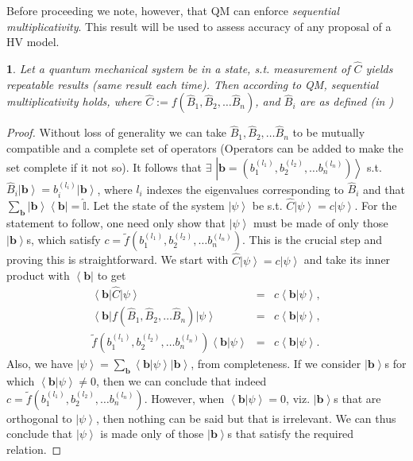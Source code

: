 \documentclass[british,aps,prl,superscriptaddress,nofootinbib,times,reprint]{revtex4-1}
\theoremstyle{plain}
\theoremstyle{definition}
\theoremstyle{remark}
\theoremstyle{remark}
\theoremstyle{remark}
\theoremstyle{plain}
\newtheorem*{prop*}{\protect\propositionname}
\theoremstyle{plain}
\theoremstyle{plain}
\theoremstyle{definition}
\theoremstyle{definition}
\providecommand{\propositionname}{Proposition}
\begin{document}
Before proceeding we note, however, that QM can
enforce \emph{sequential multiplicativity}. This
result will be used to assess accuracy of any
proposal of a HV
model.
\begin{prop*} 
Let a quantum mechanical 
system be in a state, s.t. measurement of
$\hat{C}$ yields repeatable results (same result
each time). Then according to QM, \emph{sequential
multiplicativity} holds, where $\hat{C}:=
f(\hat{B}_{1},\hat{B}_{2},\dots\hat{B}_{n})$, and
$\hat{B}_{i}$ are as defined (in )
\end{prop*}
\begin{proof} 
Without loss of generality we can take
$\hat{B}_{1},\hat{B}_{2},\dots\hat{B}_{n}$ to be
mutually compatible and a complete set of
operators (Operators can be added to make the set
complete if it not so).
It follows
that $\exists$
$\left|\mathbf{b}=\left(b_{1}^{(l_{1})},b_{2}^{(l_{2})},\dots
b_{n}^{(l_{n})}\right)\right\rangle $ s.t.
$\hat{B}_{i}\left|\mathbf{b}\right\rangle
=b_{i}^{(l_{i})}\left|\mathbf{b}\right\rangle $,
where $l_{i}$ indexes the eigenvalues
corresponding to $\hat{B}_{i}$ and that
$\sum_{\mathbf{b}}\left|\mathbf{b}\right\rangle
\left\langle \mathbf{b}\right|=\hat{\mathbb{I}}$.
Let the state of the system
$\left|\psi\right\rangle $ be s.t.
$\hat{C}\left|\psi\right\rangle
=c\left|\psi\right\rangle $. For
the statement to follow, one need only show that
$\left|\psi\right\rangle $ must be made of only
those $\left|\mathbf{b}\right\rangle $s, which
satisfy $c=\tilde
f(b_{1}^{(l_{1})},b_{2}^{(l_{2})},\dots
b_{n}^{(l_{n})})$.  This is the crucial step and
proving this is straightforward. We start with
$\hat{C}\left|\psi\right\rangle
=c\left|\psi\right\rangle $ and take its inner
product with $\left\langle \mathbf{b}\right|$ to
get \begin{eqnarray*} \left\langle
\mathbf{b}\right|\hat{C}\left|\psi\right\rangle  &
= & c\left\langle \mathbf{b}|\psi\right\rangle ,\\
\left\langle
\mathbf{b}\right|f(\hat{B}_{1},\hat{B}_{2},\dots\hat{B}_{n})
\left|\psi\right\rangle
& = & c\left\langle \mathbf{b}|\psi\right\rangle
,\\ \tilde f(b_{1}^{(l_{1})},b_{2}^{(l_{2})},\dots
b_{n}^{(l_{n})})\left\langle
\mathbf{b}|\psi\right\rangle  & = & c\left\langle
\mathbf{b}|\psi\right\rangle .  \end{eqnarray*}
Also, we have $\left|\psi\right\rangle
=\sum_{\mathbf{b}}\left\langle
\mathbf{b}|\psi\right\rangle
\left|\mathbf{b}\right\rangle $, from
completeness. If we consider
$\left|\mathbf{b}\right\rangle $s for which
$\left\langle \mathbf{b}|\psi\right\rangle \neq0$,
then we can conclude that indeed $c=\tilde
f(b_{1}^{(l_{1})},b_{2}^{(l_{2})},\dots
b_{n}^{(l_{n})})$. However, when $\left\langle
\mathbf{b}|\psi\right\rangle =0$, viz.
$\left|\mathbf{b}\right\rangle $s that are
orthogonal to $\left|\psi\right\rangle $, then
nothing can be said but that is irrelevant. We can thus conclude that
$\left|\psi\right\rangle $ is made only of those
$\left|\mathbf{b}\right\rangle $s that satisfy the
required relation.
\end{proof} 
\end{document}
